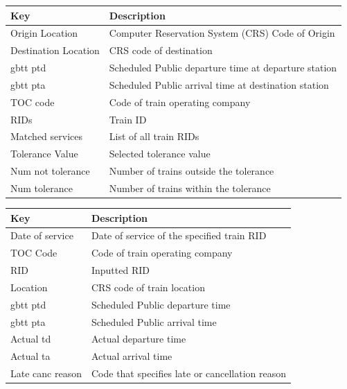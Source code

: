 \documentclass[]{interact}
\theoremstyle{plain}%
\theoremstyle{definition}
\theoremstyle{remark}
\begin{document}
\begin{table}[H]
{\begin{tabular}{ll} 
 Key  &  Description\\ \midrule
 Origin Location  &  Computer Reservation System (CRS) Code of Origin\\
 Destination Location  &  CRS code of destination\\
 gbtt ptd  &  Scheduled Public departure time at departure station\\
 gbtt pta  &  Scheduled Public arrival time at destination station\\
 TOC code  &  Code of train operating company\\
 RIDs  &  Train ID\\
 Matched services  &  List of all train RIDs \\
 Tolerance Value  &  Selected tolerance value\\
 Num not tolerance  &  Number of trains outside the tolerance\\
 Num tolerance  &  Number of trains within the tolerance\\
 \bottomrule
\end{tabular}}
\label{ServiceMetrics}
\end{table}

\begin{table}[H]
{\begin{tabular}{ll} 
 Key  &  Description\\ \midrule
 Date of service  &  Date of service of the specified train RID\\
 TOC Code  &  Code of train operating company\\
 RID  &  Inputted RID\\
 Location  &  CRS code of train location\\
 gbtt ptd  &  Scheduled Public departure time\\
 gbtt pta  &  Scheduled Public arrival time\\
 Actual td  &  Actual departure time\\
 Actual ta  &  Actual arrival time\\
 Late canc reason  &  Code that specifies late or cancellation reason\\
 \bottomrule
\end{tabular}}
\label{ServiceDetails}
\end{table}
\end{document}
